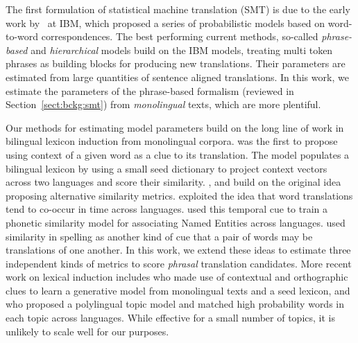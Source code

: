\documentclass[11pt]{article}
\newcommand{\mnote}[1]{\marginpar{%
  \vskip-\baselineskip
  \raggedright\footnotesize
  \itshape\hrule\smallskip\tiny{#1}\par\smallskip\hrule}}
\newcommand{\mtodo}[1]{\mnote{\textcolor{red}{#1}}}
\newcommand{\secref}[1]{Section~\ref{#1}}
\begin{document}
The first formulation of statistical machine translation (SMT) is due to the early work by~ at IBM, which proposed a series of probabilistic models based on word-to-word correspondences.  The best performing current methods, so-called {\em phrase-based} and {\em hierarchical} models \cite{Och:2002,Koehn:2003,Chiang:2005} build on the IBM models, treating multi token phrases as building blocks for producing new translations.  Their parameters are estimated from large quantities of sentence aligned translations.
In this work, we estimate the parameters of the phrase-based formalism (reviewed in \secref{sect:bckg:smt}) from {\em monolingual} texts, which are more plentiful. \nocite{Smith2010,Uszkoreit:2010} \mtodo{No cite parallel data extraction work, e.g. Marku, Smith, Uszkoreit?}

Our methods for estimating model parameters build on the long line of work in bilingual lexicon induction from monolingual corpora.  was the first to propose using context of a given word as a clue to its translation.  The model populates a bilingual lexicon by using a small seed dictionary to project context vectors across two languages and score their similarity. , and  build on the original idea proposing alternative similarity metrics.  exploited the idea that word translations tend to co-occur in time across languages.  used this temporal cue to train a phonetic similarity model for associating Named Entities across languages.   used similarity in spelling as another kind of cue that a pair of words may be translations of one another.  In this work, we extend these ideas to estimate three independent kinds of metrics to score {\em phrasal} translation candidates.  More recent work on lexical induction includes  who made use of contextual and orthographic clues to learn a generative model from monolingual texts and a seed lexicon, and  who proposed a polylingual topic model and matched high probability words in each topic across languages.  While effective for a small number of topics, it is unlikely to scale well for our purposes. %
\end{document}
